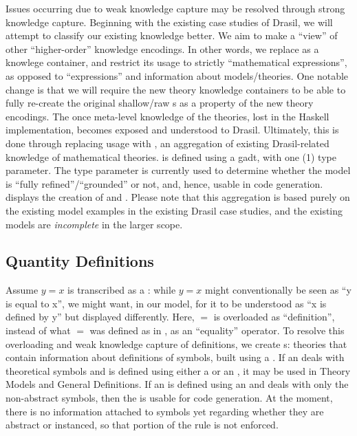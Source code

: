 Issues occurring due to weak knowledge capture may be resolved through strong
knowledge capture. Beginning with the existing case studies of Drasil, we will
attempt to classify our existing knowledge better. We aim to make
\RelationConcept{} a ``view'' of other ``higher-order'' knowledge encodings. In other
words, we replace \Expr{} as a knowlege container, and restrict its usage to
strictly ``mathematical expressions'', as opposed to ``expressions'' and
information about models/theories. One notable change is that we will require
the new theory knowledge containers to be able to fully re-create the original
shallow/raw \Expr{}s as a property of the new theory encodings. The once
meta-level knowledge of the theories, lost in the Haskell implementation,
becomes exposed and understood to Drasil. Ultimately, this is done through
replacing \RelationConcept{} usage with \ModelKind{}, an aggregation of existing
Drasil-related knowledge of mathematical theories. \ModelKind{} is defined using
a \acs{gadt}, with one (1) type parameter. The type parameter is currently used
to determine whether the model is ``fully refined''/``grounded'' or not, and,
hence, usable in code generation.  displays the
creation of \ModelKind{} and \ModelKinds{}. Please note that this aggregation is
based purely on the existing model examples in the existing Drasil case studies,
and the existing models are \textit{incomplete} in the larger scope.


\currentModelKindsHaskell{}

\subsection{Quantity Definitions}

Assume \(y = x\) is transcribed as a \RelationConcept{}: while \(y = x\) might
conventionally be seen as ``y is equal to x'', we might want, in our model, for
it to be understood as ``x is defined by y'' but displayed differently. Here,
\(=\) is overloaded as ``definition'', instead of what \(=\) was defined as in
\Expr{}, as an ``equality'' operator. To resolve this overloading and weak
knowledge capture of definitions, we create \EquationalModel{}s: theories that
contain information about definitions of symbols, built using a
\QDefinition{}. If an \EquationalModel{}
deals with theoretical symbols and is defined using either a \ModelExpr{} or an
\Expr{}, it may be used in Theory Models and General Definitions. If an
\EquationalModel{} is defined using an \Expr{} and deals with only the
non-abstract symbols, then the
\EquationalModel{} is usable for code generation. At the moment, there is no
information attached to symbols yet regarding whether they are abstract or
instanced, so that portion of the rule is not enforced.

